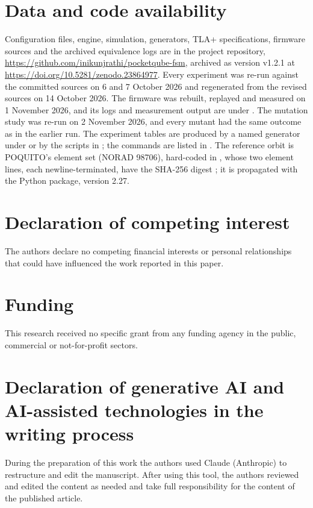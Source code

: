 \documentclass[preprint,12pt]{elsarticle}
\begin{document}
\section*{Data and code availability}
Configuration files, engine, simulation, generators, TLA+ specifications, firmware sources and the archived equivalence logs are in the project repository, \url{https://github.com/inikunjrathi/pocketqube-fsm}, archived as version v1.2.1 at \url{https://doi.org/10.5281/zenodo.23864977}. Every experiment was re-run against the committed sources on 6 and 7 October 2026 and regenerated from the revised sources on 14 October 2026. The firmware was rebuilt, replayed and measured on 1 November 2026, and its logs and measurement output are under . The mutation study was re-run on 2 November 2026, and every mutant had the same outcome as in the earlier run. The experiment tables are produced by a named generator under  or by the scripts in ; the commands are listed in . The reference orbit is POQUITO's element set (NORAD 98706), hard-coded in , whose two element lines, each newline-terminated, have the SHA-256 digest  ; it is propagated with the  Python package, version 2.27.

\section*{Declaration of competing interest}
The authors declare no competing financial interests or personal relationships that could have influenced the work reported in this paper.

\section*{Funding}
This research received no specific grant from any funding agency in the public, commercial or not-for-profit sectors.

\section*{Declaration of generative AI and AI-assisted technologies in the writing process}
During the preparation of this work the authors used Claude (Anthropic) to restructure and edit the manuscript. After using this tool, the authors reviewed and edited the content as needed and take full responsibility for the content of the published article.
\end{document}
